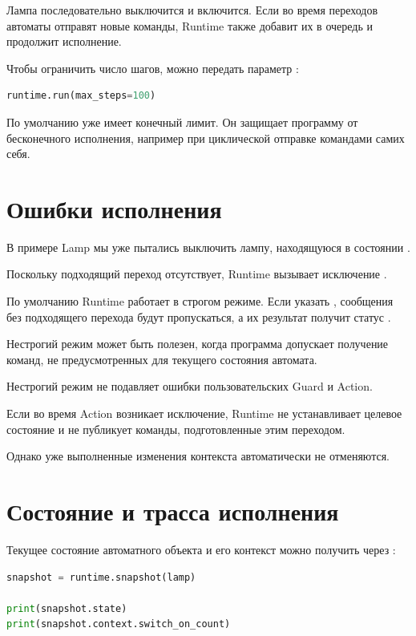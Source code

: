 Лампа последовательно выключится и включится.
Если во время переходов автоматы отправят новые
команды, Runtime также добавит их в очередь
и продолжит исполнение.

Чтобы ограничить число шагов, можно передать
параметр :

\begin{lstlisting}[language=Python,numbers=none]
runtime.run(max_steps=100)
\end{lstlisting}

По умолчанию  уже имеет конечный лимит.
Он защищает программу от бесконечного исполнения,
например при циклической отправке командами самих себя.

\section{Ошибки исполнения}

В примере Lamp мы уже пытались выключить лампу,
находящуюся в состоянии .

Поскольку подходящий переход отсутствует,
Runtime вызывает исключение .

По умолчанию Runtime работает в строгом режиме.
Если указать , сообщения без
подходящего перехода будут пропускаться, а их
результат получит статус .

Нестрогий режим может быть полезен, когда программа
допускает получение команд, не предусмотренных
для текущего состояния автомата.

\begin{importantbox}
Нестрогий режим не подавляет ошибки пользовательских
Guard и Action.

Если во время Action возникает исключение, Runtime
не устанавливает целевое состояние и не публикует
команды, подготовленные этим переходом.

Однако уже выполненные изменения контекста
автоматически не отменяются.
\end{importantbox}

\section{Состояние и трасса исполнения}

Текущее состояние автоматного объекта и его контекст
можно получить через :

\begin{lstlisting}[language=Python,numbers=none]
snapshot = runtime.snapshot(lamp)

print(snapshot.state)
print(snapshot.context.switch_on_count)
\end{lstlisting}

